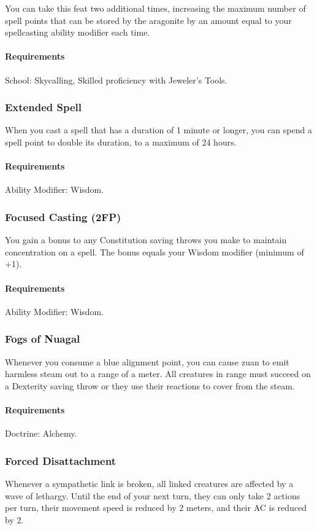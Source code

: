     You can take this feat two additional times, increasing the maximum number of spell points that can be stored by the aragonite by an amount equal to your spellcasting ability modifier each time.
    \paragraph{Requirements} School: Skycalling, Skilled proficiency with Jeweler's Tools.
\subsubsection{Extended Spell} \label{feat::extendedspell}
    When you cast a spell that has a duration of 1 minute or longer, you can spend a spell point to double its duration, to a maximum of 24 hours.
    \paragraph{Requirements} Ability Modifier: Wisdom.
\subsubsection{Focused Casting (2FP)} \label{feat::focusedcasting}
    You gain a bonus to any Constitution saving throws you make to maintain concentration on a spell.
    The bonus equals your Wisdom modifier (minimum of +1).
    \paragraph{Requirements} Ability Modifier: Wisdom.
\subsubsection{Fogs of Nuagal} \label{feat::fogsofnuagal}
    Whenever you consume a blue alignment point, you can cause zuan to emit harmless steam out to a range of a meter.
    All creatures in range must succeed on a Dexterity saving throw or they use their reactions to cover from the steam.
    \paragraph{Requirements} Doctrine: Alchemy.
\subsubsection{Forced Disattachment} \label{feat::forceddisattachment}
    Whenever a sympathetic link is broken, all linked creatures are affected by a wave of lethargy.
    Until the end of your next turn, they can only take 2 actions per turn, their movement speed is reduced by 2 meters, and their AC is reduced by 2.
